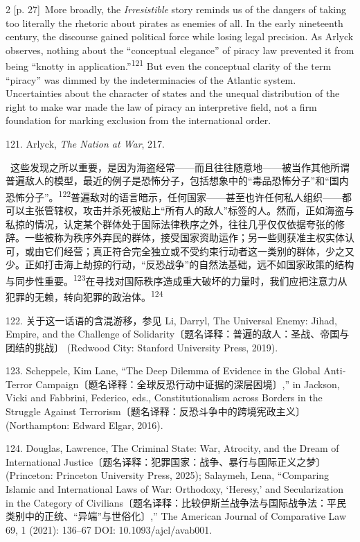 \documentclass[10pt,a4paper]{article}
\begin{document}
\begin{paracol}{2}
{\scriptsize\color{gray} [p. 27]}\ More broadly, the \textit{Irresistible} story reminds us of the dangers of taking too literally the rhetoric about pirates as enemies of all. In the early nineteenth century, the discourse gained political force while losing legal precision. As Arlyck observes, nothing about the “conceptual elegance” of piracy law prevented it from being “knotty in application.”\nobreak\textsuperscript{121} But even the conceptual clarity of the term “piracy” was dimmed by the indeterminacies of the Atlantic system. Uncertainties about the character of states and the unequal distribution of the right to make war made the law of piracy an interpretive field, not a firm foundation for marking exclusion from the international order.\par{\small 121. Arlyck, \textit{The Nation at War}, 217.\par}
\switchcolumn*
{\scriptsize\color{gray} [p. 27]}\ 这些发现之所以重要，是因为海盗经常——而且往往随意地——被当作其他所谓普遍敌人的模型，最近的例子是恐怖分子，包括想象中的“毒品恐怖分子”和“国内恐怖分子”。\nobreak\textsuperscript{122}普遍敌对的语言暗示，任何国家——甚至也许任何私人组织——都可以主张管辖权，攻击并杀死被贴上“所有人的敌人”标签的人。然而，正如海盗与私掠的情况，认定某个群体处于国际法律秩序之外，往往几乎仅仅依据夸张的修辞。一些被称为秩序外弃民的群体，接受国家资助运作；另一些则获准主权实体认可，或由它们经营；真正符合完全独立或不受约束行动者这一类别的群体，少之又少。正如打击海上劫掠的行动，“反恐战争”的自然法基础，远不如国家政策的结构与同步性重\mbox{要。\textsuperscript{123}}在寻找对国际秩序造成重大破坏的力量时，我们应把注意力从犯罪的无赖，转向犯罪的政治\mbox{体。\textsuperscript{124}}\par{\small 122. 关于这一话语的含混游移，参见 Li, Darryl, The Universal Enemy: Jihad, Empire, and the Challenge of Solidarity〔题名译释：普遍的敌人：圣战、帝国与团结的挑战〕 (Redwood City: Stanford University Press, 2019).\par}{\small 123. Scheppele, Kim Lane, “The Deep Dilemma of Evidence in the Global Anti‐Terror Campaign〔题名译释：全球反恐行动中证据的深层困境〕,” in Jackson, Vicki and Fabbrini, Federico, eds., Constitutionalism across Borders in the Struggle Against Terrorism〔题名译释：反恐斗争中的跨境宪政主义〕 (Northampton: Edward Elgar, 2016).\par}{\small 124. Douglas, Lawrence, The Criminal State: War, Atrocity, and the Dream of International Justice〔题名译释：犯罪国家：战争、暴行与国际正义之梦〕 (Princeton: Princeton University Press, 2025); Salaymeh, Lena, “Comparing Islamic and International Laws of War: Orthodoxy, ‘Heresy,’ and Secularization in the Category of Civilians〔题名译释：比较伊斯兰战争法与国际战争法：平民类别中的正统、“异端”与世俗化〕,” The American Journal of Comparative Law 69, 1 (2021): 136–67 DOI: 10.1093/ajcl/avab001.\par}

\end{paracol}
\end{document}
